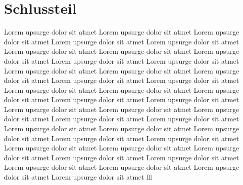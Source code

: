 \section{Schlussteil}

Lorem upsurge dolor sit atmet Lorem upsurge dolor sit atmet Lorem upsurge dolor sit atmet Lorem upsurge dolor sit atmet Lorem upsurge dolor sit atmet Lorem upsurge dolor sit atmet Lorem upsurge dolor sit atmet Lorem upsurge dolor sit atmet Lorem upsurge dolor sit atmet Lorem upsurge dolor sit atmet Lorem upsurge dolor sit atmet Lorem upsurge dolor sit atmet Lorem upsurge dolor sit atmet Lorem upsurge dolor sit atmet Lorem upsurge dolor sit atmet Lorem upsurge dolor sit atmet Lorem upsurge dolor sit atmet Lorem upsurge dolor sit atmet Lorem upsurge dolor sit atmet Lorem upsurge dolor sit atmet Lorem upsurge dolor sit atmet Lorem upsurge dolor sit atmet Lorem upsurge dolor sit atmet Lorem upsurge dolor sit atmet Lorem upsurge dolor sit atmet Lorem upsurge dolor sit atmet Lorem upsurge dolor sit atmet Lorem upsurge dolor sit atmet Lorem upsurge dolor sit atmet Lorem upsurge dolor sit atmet Lorem upsurge dolor sit atmet Lorem upsurge dolor sit atmet Lorem upsurge dolor sit atmet Lorem upsurge dolor sit atmet Lorem upsurge dolor sit atmet Lorem upsurge dolor sit atmet Lorem upsurge dolor sit atmet Lorem upsurge dolor sit atmet Lorem upsurge dolor sit atmet
lll